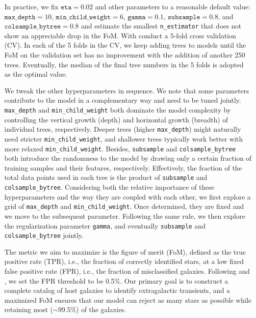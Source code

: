 \documentclass[twocolumn]{aastex631}
\begin{document}
\begin{CJK*}{UTF8}{gbsn}
In practice, we fix $\texttt{eta}=0.02$ and other parameters to a reasonable default value: $\texttt{max\_depth}=10$, $\texttt{min\_child\_weight}=6$, $\texttt{gamma}=0.1$, $\texttt{subsample}=0.8$, and $\texttt{colsample\_bytree}=0.8$ and estimate the smallest \texttt{n\_estimator} that does not show an appreciable drop in the FoM. With conduct a 5-fold cross validation (CV). In each of the 5 folds in the CV, we keep adding trees to models until the FoM on the validation set has no improvement with the addition of another 250 trees. Eventually, the median of the final tree numbers in the 5 folds is adopted as the optimal value. 

We tweak the other hyperparameters in sequence. We note that some parameters contribute to the model in a complementary way and need to be tuned jointly. \texttt{max\_depth} and \texttt{min\_child\_weight} both dominate the model complexity by controlling the vertical growth (depth) and horizontal growth (breadth) of individual trees, respectively. Deeper trees (higher \texttt{max\_depth}) might naturally need stricter \texttt{min\_child\_weight}, and shallower trees typically work better with more relaxed \texttt{min\_child\_weight}. Besides, \texttt{subsample} and \texttt{colsample\_bytree} both introduce the randomness to the model by drawing only a certain fraction of training samples and their features, respectively. Effectively, the fraction of the total data points used in each tree is the product of \texttt{subsample} and \texttt{colsample\_bytree}.
Considering both the relative importance of these hyperparameters and the way they are coupled with each other, we first explore a grid of \texttt{max\_depth} and \texttt{min\_child\_weight}. Once determined, they are fixed and we move to the subsequent parameter. Following the same rule, we then explore the regularization parameter \texttt{gamma}, and eventually \texttt{subsample} and \texttt{colsample\_bytree} jointly. 

The metric we aim to maximize is the figure of merit (FoM), defined as the true positive rate (TPR), i.e., the fraction of correctly identified stars, at a low fixed false positive rate (FPR), i.e., the fraction of misclassified galaxies. Following \cite{Miller_2017} and , we set the FPR threshold to be 0.5\%. Our primary goal is to construct a complete catalog of host galaxies to identify extragalactic transients, and a maximized FoM ensures that our model can reject as many stars as possible while retaining most ($\sim$99.5\%) of the galaxies.


\end{CJK*}
\end{document}
